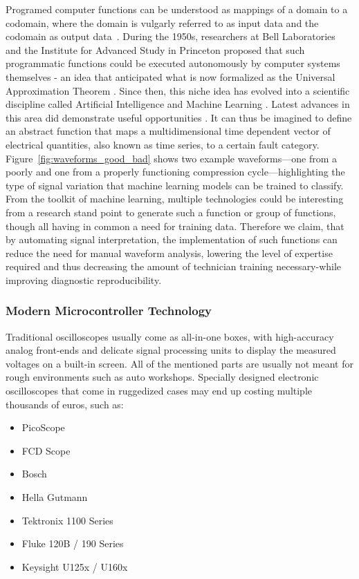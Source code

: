 Programed computer functions can be understood as mappings of a domain to a codomain, where the domain is vulgarly referred to as input data and the codomain as output data~\cite{knuth71, wirth76}. 
During the 1950s, researchers at Bell Laboratories and the Institute for Advanced Study in Princeton proposed that such programmatic functions could be executed autonomously by computer systems themselves 
- an idea that anticipated what is now formalized as the Universal Approximation Theorem  \cite{Cybenko1989, Hornik1991}. 
Since then, this niche idea has evolved into a scientific discipline called Artificial Intelligence and Machine Learning \cite{RussellNorvig2020, Goodfellow2016}. 
Latest advances in this area did demonstrate useful opportunities \cite{LeCun2015, Silver2016}. 
It can thus be imagined to define an abstract function that maps a multidimensional time dependent vector of electrical quantities, also known as time series, to a certain fault category. 
Figure~\ref{fig:waveforms_good_bad} shows two example waveforms—one from a poorly and one from a properly functioning compression cycle—highlighting the type of signal variation that machine learning models can be trained to classify.
From the toolkit of machine learning, multiple technologies could be interesting from a research stand point to generate such a function or group of functions, though all having in common a need for training data. 
Therefore we claim, that by automating signal interpretation, the implementation of such functions can reduce the need for manual waveform analysis, 
lowering the level of expertise required and thus decreasing the amount of technician training necessary-while improving diagnostic reproducibility.

\subsubsection{Modern Microcontroller Technology}
Traditional oscilloscopes usually come as all-in-one boxes, with high-accuracy analog front-ends and delicate signal processing units to display the measured voltages on a built-in screen. 
All of the mentioned parts are usually not meant for rough environments such as auto workshops. 
Specially designed electronic oscilloscopes that come in ruggedized cases may end up costing multiple thousands of euros, such as:
\begin{itemize}
    \item PicoScope
    \item FCD Scope
    \item Bosch
    \item Hella Gutmann
    \item Tektronix 1100 Series
    \item Fluke 120B / 190 Series
    \item Keysight U125x / U160x
\end{itemize}

